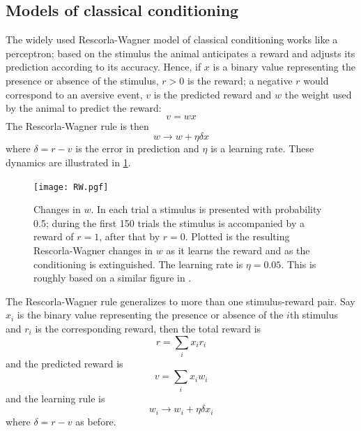 \documentclass[11pt,a4paper]{scrartcl}
\begin{document}
\subsection*{Models of classical conditioning}

The widely used Rescorla-Wagner model of classical conditioning works
\cite{RescorlaWagner1972a} like a perceptron; based on the stimulus
the animal anticipates a reward and adjusts its prediction according
to its accuracy. Hence, if $x$ is a binary value representing the
presence or absence of the stimulus, $r>0$ is the reward; a negative
$r$ would correspond to an aversive event, $v$ is the predicted reward and $w$ the weight used by the animal to predict the reward:
\begin{equation}
v=wx
\end{equation}
The Rescorla-Wagner rule is then
\begin{equation}
w\rightarrow w+\eta \delta x
\end{equation}
where $\delta =r-v$ is the error in prediction and $\eta$ is a
learning rate. These dynamics are illustrated in \ref{fig:w}.

\begin{figure}
\begin{center}
\texttt{[image: RW.pgf]}%
\end{center}
\caption{Changes in $w$. In each trial a stimulus is presented with probability 0.5; during the first 150 trials the stimulus is accompanied by a reward of $r=1$, after that by $r=0$. Plotted is the resulting Rescorla-Wagner changes in $w$ as it learns the reward and as the conditioning is extinguished. The learning rate is $\eta=0.05$. This is roughly based on a similar figure in \cite{DayanAbbott2001a}. \label{fig:w}}
\end{figure}

The Rescorla-Wagner rule generalizes to more than one stimulus-reward pair. Say $x_i$ is the binary value representing the presence or absence of the $i$th stimulus and $r_i$ is the corresponding reward, then the total reward is
\begin{equation}
r=\sum_i x_ir_i
\end{equation}
and the predicted reward is
\begin{equation}
v=\sum_i x_iw_i
\end{equation}
and the learning rule is
\begin{equation}
w_i\rightarrow w_i+\eta\delta x_i
\end{equation}
where $\delta=r-v$ as before. 
\end{document}
